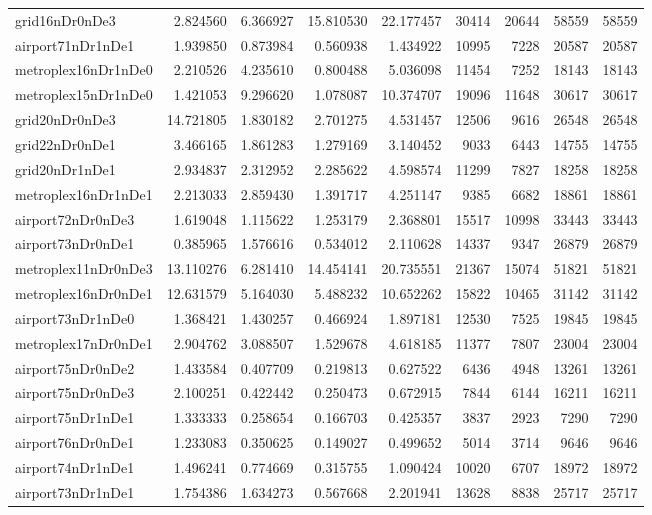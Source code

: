 \begin{longtable}{|l|r|r|r|r|r|r|r|r|}
grid16nDr0nDe3 & 2.824560 & 6.366927 & 15.810530 & 22.177457 & 30414 & 20644 & 58559 & 58559 \\
airport71nDr1nDe1 & 1.939850 & 0.873984 & 0.560938 & 1.434922 & 10995 & 7228 & 20587 & 20587 \\
metroplex16nDr1nDe0 & 2.210526 & 4.235610 & 0.800488 & 5.036098 & 11454 & 7252 & 18143 & 18143 \\
metroplex15nDr1nDe0 & 1.421053 & 9.296620 & 1.078087 & 10.374707 & 19096 & 11648 & 30617 & 30617 \\
grid20nDr0nDe3 & 14.721805 & 1.830182 & 2.701275 & 4.531457 & 12506 & 9616 & 26548 & 26548 \\
grid22nDr0nDe1 & 3.466165 & 1.861283 & 1.279169 & 3.140452 & 9033 & 6443 & 14755 & 14755 \\
grid20nDr1nDe1 & 2.934837 & 2.312952 & 2.285622 & 4.598574 & 11299 & 7827 & 18258 & 18258 \\
metroplex16nDr1nDe1 & 2.213033 & 2.859430 & 1.391717 & 4.251147 & 9385 & 6682 & 18861 & 18861 \\
airport72nDr0nDe3 & 1.619048 & 1.115622 & 1.253179 & 2.368801 & 15517 & 10998 & 33443 & 33443 \\
airport73nDr0nDe1 & 0.385965 & 1.576616 & 0.534012 & 2.110628 & 14337 & 9347 & 26879 & 26879 \\
metroplex11nDr0nDe3 & 13.110276 & 6.281410 & 14.454141 & 20.735551 & 21367 & 15074 & 51821 & 51821 \\
metroplex16nDr0nDe1 & 12.631579 & 5.164030 & 5.488232 & 10.652262 & 15822 & 10465 & 31142 & 31142 \\
airport73nDr1nDe0 & 1.368421 & 1.430257 & 0.466924 & 1.897181 & 12530 & 7525 & 19845 & 19845 \\
metroplex17nDr0nDe1 & 2.904762 & 3.088507 & 1.529678 & 4.618185 & 11377 & 7807 & 23004 & 23004 \\
airport75nDr0nDe2 & 1.433584 & 0.407709 & 0.219813 & 0.627522 & 6436 & 4948 & 13261 & 13261 \\
airport75nDr0nDe3 & 2.100251 & 0.422442 & 0.250473 & 0.672915 & 7844 & 6144 & 16211 & 16211 \\
airport75nDr1nDe1 & 1.333333 & 0.258654 & 0.166703 & 0.425357 & 3837 & 2923 & 7290 & 7290 \\
airport76nDr0nDe1 & 1.233083 & 0.350625 & 0.149027 & 0.499652 & 5014 & 3714 & 9646 & 9646 \\
airport74nDr1nDe1 & 1.496241 & 0.774669 & 0.315755 & 1.090424 & 10020 & 6707 & 18972 & 18972 \\
airport73nDr1nDe1 & 1.754386 & 1.634273 & 0.567668 & 2.201941 & 13628 & 8838 & 25717 & 25717 \\

\end{longtable}
